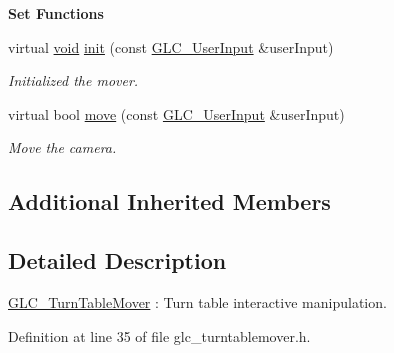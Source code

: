 \begin{Indent}{\bf Set Functions}\par
\begin{DoxyCompactItemize}
\item 
virtual \hyperlink{group___u_a_v_objects_plugin_ga444cf2ff3f0ecbe028adce838d373f5c}{void} \hyperlink{class_g_l_c___turn_table_mover_a456b3375eea1b1aeb8001cdf25ebe53d}{init} (const \hyperlink{class_g_l_c___user_input}{G\-L\-C\-\_\-\-User\-Input} \&user\-Input)
\begin{DoxyCompactList}\small\item\em Initialized the mover. \end{DoxyCompactList}\item 
virtual bool \hyperlink{class_g_l_c___turn_table_mover_a88a3c009a44516ea4d24a83599687aae}{move} (const \hyperlink{class_g_l_c___user_input}{G\-L\-C\-\_\-\-User\-Input} \&user\-Input)
\begin{DoxyCompactList}\small\item\em Move the camera. \end{DoxyCompactList}\end{DoxyCompactItemize}
\end{Indent}
\subsection*{Additional Inherited Members}


\subsection{Detailed Description}
\hyperlink{class_g_l_c___turn_table_mover}{G\-L\-C\-\_\-\-Turn\-Table\-Mover} \-: Turn table interactive manipulation. 

Definition at line 35 of file glc\-\_\-turntablemover.\-h.



